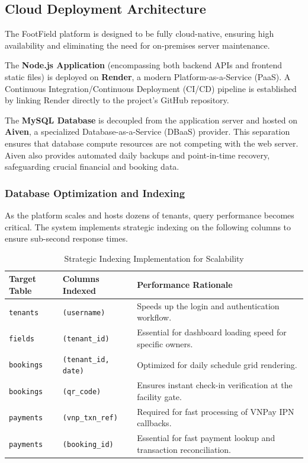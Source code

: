 \subsection{Cloud Deployment Architecture}
The FootField platform is designed to be fully cloud-native, ensuring high availability and eliminating the need for on-premises server maintenance.

The \textbf{Node.js Application} (encompassing both backend APIs and frontend static files) is deployed on \textbf{Render}, a modern Platform-as-a-Service (PaaS). A Continuous Integration/Continuous Deployment (CI/CD) pipeline is established by linking Render directly to the project's GitHub repository.

The \textbf{MySQL Database} is decoupled from the application server and hosted on \textbf{Aiven}, a specialized Database-as-a-Service (DBaaS) provider. This separation ensures that database compute resources are not competing with the web server. Aiven also provides automated daily backups and point-in-time recovery, safeguarding crucial financial and booking data.

\subsubsection{Database Optimization and Indexing}
As the platform scales and hosts dozens of tenants, query performance becomes critical. The system implements strategic indexing on the following columns to ensure sub-second response times.

\begin{table}[htbp]
\centering
\begin{tabularx}{\textwidth}{|l|l|X|}
\hline
\rowcolor{LightCyan}
\textbf{Target Table} & \textbf{Columns Indexed} & \textbf{Performance Rationale} \\ \hline
\texttt{tenants} & \texttt{(username)} & Speeds up the login and authentication workflow. \\ \hline
\texttt{fields} & \texttt{(tenant\_id)} & Essential for dashboard loading speed for specific owners. \\ \hline
\texttt{bookings} & \texttt{(tenant\_id, date)} & Optimized for daily schedule grid rendering. \\ \hline
\texttt{bookings} & \texttt{(qr\_code)} & Ensures instant check-in verification at the facility gate. \\ \hline
\texttt{payments} & \texttt{(vnp\_txn\_ref)} & Required for fast processing of VNPay IPN callbacks. \\ \hline
\texttt{payments} & \texttt{(booking\_id)} & Essential for fast payment lookup and transaction reconciliation. \\ \hline
\end{tabularx}
\caption{Strategic Indexing Implementation for Scalability}
\end{table}

